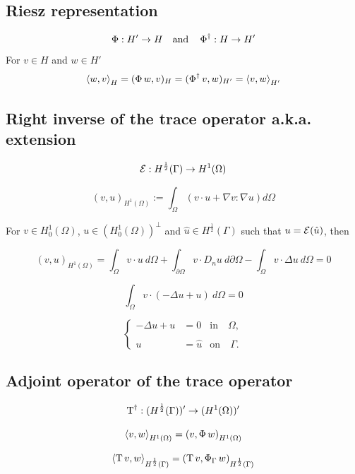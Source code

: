 \section{}

\subsection{Riesz representation}

$$\operatorname{\Phi}: H' \to H \quad \textnormal{and} \quad \operatorname{\Phi}^\dagger: H \to H'$$
For $v \in H$ and $w \in H'$
$$
\left\langle w, v\right\rangle_{H}=
( \operatorname{\Phi} w, v)_{H}=
( \operatorname{\Phi}^\dagger v, w )_{H'}=
\left\langle v, w\right\rangle_{H'}
$$

\subsection{Right inverse of the trace operator a.k.a. extension}

$$\mathcal{E}:H^\frac12(\Gamma) \to H^1(\Omega)$$

$$\left(v,u\right)_{H^1(\Omega)} := 
\int_{\Omega} \left( v \cdot u + \nabla v : \nabla u\right) d \Omega $$

For $v \in H^1_0(\Omega)$, $u \in \left(H^1_0(\Omega)\right)^{\perp}$ and $\hat{u} \in H^\frac12(\Gamma)$ such that $u = \mathcal{E}(\hat{u})$, then

$$\left(v,u\right)_{H^1(\Omega)} = \int_{\Omega} v \cdot u \: d \Omega +\int_{\partial \Omega} v \cdot D_nu \: d\partial\Omega - \int_{\Omega} v \cdot \Delta u \: d \Omega = 0$$

$$\int_{\Omega} v \cdot \left(-\Delta u + u \right) \: d \Omega = 0 $$

$$
\left\lbrace
\begin{array}{rll}
	-\Delta u + u & = 0       & \textrm{in} \quad \Omega,\\
	\\
	u             & = \hat{u} & \textrm{on} \quad \Gamma.
\end{array} 	
\right. 
$$

\subsection{Adjoint operator of the trace operator}

$$\operatorname{T}^\dagger:(H^\frac12(\Gamma))' \to (H^1(\Omega))'$$

$$\left\langle v, w \right\rangle_{H^1(\Omega)} = \left( v, \operatorname{\Phi} w \right)_{H^1(\Omega)}$$

$$\left\langle \operatorname{T} v, w \right\rangle_{H^\frac12(\Gamma)} = \left( \operatorname{T} v, \operatorname{\Phi}_\Gamma w \right)_{H^\frac12(\Gamma)}$$



